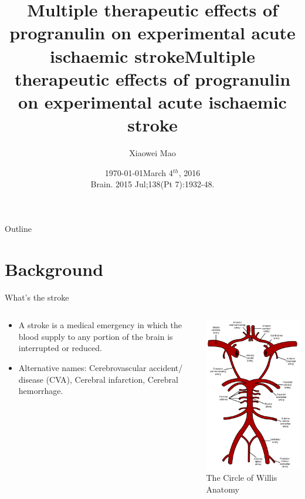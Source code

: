 \documentclass[bigger]{beamer}
\author{Xiaowei Mao}
\date{\today}
\title{Multiple therapeutic effects of progranulin on experimental acute ischaemic stroke}
\date[March 4$^{th}$, 2016]{March 4$^{th}$, 2016 \\ \vskip 0.5cm \scriptsize{Brain. 2015 Jul;138(Pt 7):1932-48.}}
\title[Progranulin on ischemic stroke]{Multiple therapeutic effects of progranulin on experimental acute ischaemic stroke}
\institute[Pharmaron]{Pharmacology, Pharmaron}
\renewcommand\maketitle{\frame[plain]{\titlepage}}
\begin{document}
\maketitle
\begin{frame}{Outline}
\setcounter{tocdepth}{1}
\tableofcontents
\end{frame}

\section{Background}
\label{sec:orgheadline10}
\begin{frame}[label={sec:orgheadline1}]{What's the stroke}
\begin{columns}
\begin{column}{0.6\columnwidth}
\begin{itemize}
\item A stroke is a medical emergency in which the blood supply to any portion of the brain is interrupted or reduced.
\end{itemize}
\vspace{0.5cm}
\begin{itemize}
\item Alternative names: Cerebrovascular accident/ disease (CVA), Cerebral infarction, Cerebral hemorrhage.
\end{itemize}
\end{column}
\begin{column}{0.4\columnwidth}
\includegraphics[width=4.5cm]{b1} \newline
\centering \scriptsize{The Circle of Willis Anatomy}
\end{column}
\end{columns}
\end{frame}
\end{document}
